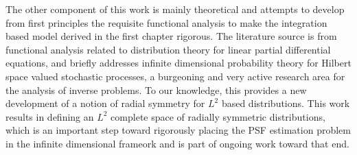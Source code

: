 \indent
The other component of this work is mainly theoretical and attempts to develop from first principles the requisite functional analysis to make the integration based model derived in the first chapter rigorous.
The literature source is from functional analysis related to distribution theory for linear partial differential equations, and briefly addresses infinite dimensional probability theory for Hilbert space valued stochastic processes, a burgeoning and very active research area for the analysis of inverse problems.
To our knowledge, this provides a new development of a notion of radial symmetry for $L^2$ based distributions.
This work results in defining an $L^2$ complete space of radially symmetric distributions, which is an important step toward rigorously placing the PSF estimation problem in the infinite dimensional frameork and is part of ongoing work toward that end.

\pagebreak
